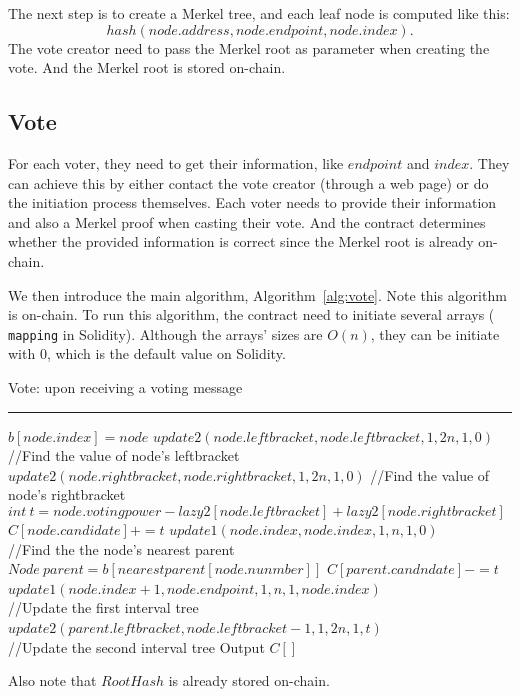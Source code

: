The next step is to create a Merkel tree, and each leaf node is computed like
this:
\[
  hash(node.address, node.endpoint, node.index).
\]
\noindent The vote creator need to pass the Merkel root as parameter when
creating the vote. And the Merkel root is stored on-chain.


\subsection{Vote}
For each voter, they need to get their information, like $endpoint$ and $index$. They can achieve
this by either contact the vote creator (through a web page) or do the
initiation process themselves. Each
voter needs to provide their information and also a Merkel proof when casting their vote. And
the contract determines whether the provided information is correct since the
Merkel root is already on-chain.

We then introduce the main algorithm, Algorithm~\ref{alg:vote}. Note this
algorithm is on-chain. To run this algorithm, the contract need to initiate several arrays (
\texttt{mapping} in Solidity). Although the arrays' sizes are $O(n)$, they can
be initiate with 0, which is the default value on Solidity.

\begin{algorithm}
	\caption{Vote: upon receiving a voting message}%
	\hrule
 
    	$b[node.index]=node$\;
		$update2(node.leftbracket,node.leftbracket,1,2n,1,0)${\color{gray}
			//Find the value of node's leftbracket}\;
		$update2(node.rightbracket,node.rightbracket,1,2n,1,0)${\color{gray}
			//Find the value of node's rightbracket}\;
		$int~t=node.votingpower-lazy2[node.leftbracket]+lazy2[node.rightbracket]$\;
		$C[node.candidate]+=t$\;
		$update1(node.index,node.index,1,n,1,0)${\color{gray}
			\\//Find the the node's nearest parent}\;
		$Node~parent = b[nearestparent[node.nunmber]]$\;
		$C[parent.candndate]-=t$\;
		$update1(node.index+1,node.endpoint,1,n,1,node.index)${\color{gray}
			\\//Update the first interval tree}\;
		$update2(parent.leftbracket,node.leftbracket-1,1,2n,1,t)${\color{gray}
			\\//Update the second interval tree}\;
		Output $C[]$
  \label{alg:vote}
\end{algorithm}
Also note that $RootHash$ is already stored on-chain.

